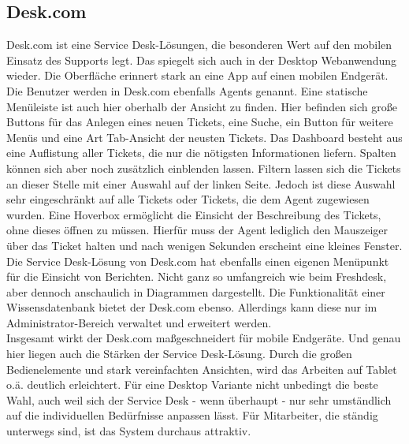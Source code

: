\subsection{Desk.com}
\noindent
Desk.com ist eine Service Desk-Lösungen, die besonderen Wert auf den mobilen Einsatz des Supports legt. Das spiegelt sich auch in der Desktop Webanwendung wieder. Die Oberfläche erinnert stark an eine App auf einen mobilen Endgerät. Die Benutzer werden in Desk.com ebenfalls Agents genannt. 
Eine statische Menüleiste ist auch hier oberhalb der Ansicht zu finden. Hier befinden sich große Buttons für das Anlegen eines neuen Tickets, eine Suche, ein Button für weitere Menüs und eine Art Tab-Ansicht der neusten Tickets. Das Dashboard besteht aus eine Auflistung aller Tickets, die nur die nötigsten Informationen liefern. Spalten können sich aber noch zusätzlich einblenden lassen. Filtern lassen sich die Tickets an dieser Stelle mit einer Auswahl auf der linken Seite. Jedoch ist diese Auswahl sehr eingeschränkt auf alle Tickets oder Tickets, die dem Agent zugewiesen wurden. Eine Hoverbox ermöglicht die Einsicht der Beschreibung des Tickets, ohne dieses öffnen zu müssen. Hierfür muss der Agent lediglich den Mauszeiger über das Ticket halten und nach wenigen Sekunden erscheint eine kleines Fenster. Die Service Desk-Lösung von Desk.com hat ebenfalls einen eigenen Menüpunkt für die Einsicht von Berichten. Nicht ganz so umfangreich wie beim Freshdesk, aber dennoch anschaulich in Diagrammen dargestellt. Die Funktionalität einer Wissensdatenbank bietet der Desk.com ebenso. Allerdings kann diese nur im Administrator-Bereich verwaltet und erweitert werden.\\
Insgesamt wirkt der Desk.com maßgeschneidert für mobile Endgeräte. Und genau hier liegen auch die Stärken der Service Desk-Lösung. Durch die großen Bedienelemente und stark vereinfachten Ansichten, wird das Arbeiten auf Tablet o.ä. deutlich erleichtert. Für eine Desktop Variante nicht unbedingt die beste Wahl, auch weil sich der Service Desk - wenn überhaupt - nur sehr umständlich auf die individuellen Bedürfnisse anpassen  lässt. Für Mitarbeiter, die ständig unterwegs sind, ist das System durchaus attraktiv.

